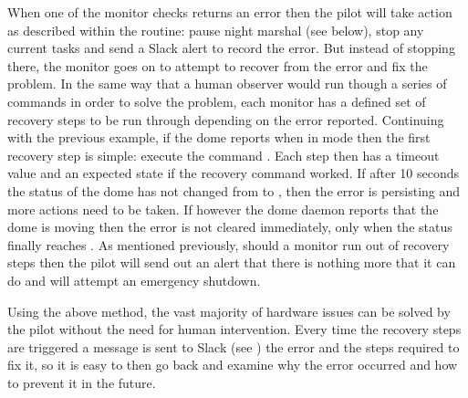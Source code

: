 \begin{colsection}
When one of the monitor checks returns an error then the pilot will take action as described within the  routine: pause night marshal (see below), stop any current tasks and send a Slack alert to record the error. But instead of stopping there, the monitor goes on to attempt to recover from the error and fix the problem. In the same way that a human observer would run though a series of commands in order to solve the problem, each monitor has a defined set of recovery steps to be run through depending on the error reported. Continuing with the previous example, if the dome reports  when in  mode then the first recovery step is simple: execute the command . Each step then has a timeout value and an expected state if the recovery command worked. If after 10 seconds the status of the dome has not changed from  to , then the error is persisting and more actions need to be taken. If however the dome daemon reports that the dome is moving then the error is not cleared immediately, only when the status finally reaches . As mentioned previously, should a monitor run out of recovery steps then the pilot will send out an alert that there is nothing more that it can do and will attempt an emergency shutdown.

Using the above method, the vast majority of hardware issues can be solved by the pilot without the need for human intervention. Every time the recovery steps are triggered a message is sent to Slack (see ) the error and the steps required to fix it, so it is easy to then go back and examine why the error occurred and how to prevent it in the future.

\newpage

\end{colsection}


